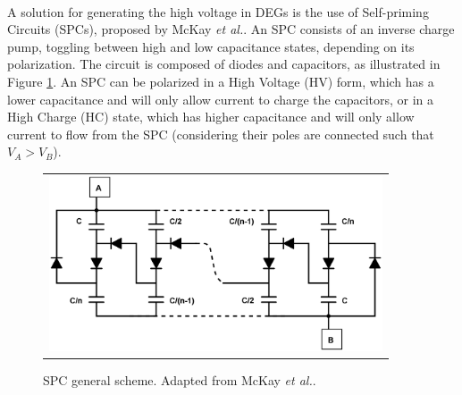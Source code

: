 \paragraph{} A solution for generating the high voltage in DEGs is the use of Self-priming Circuits (SPCs), proposed by McKay \textit{et al.}\cite{SPC2010}. An SPC consists of an inverse charge pump, toggling between high and low capacitance states, depending on its polarization. The circuit is composed of diodes and capacitors, as illustrated in Figure \ref{fig:spc}.  An SPC can be polarized in a High Voltage (HV) form, which has a lower capacitance and will only allow current to charge the capacitors, or in a High Charge (HC) state, which has higher capacitance and will only allow current to flow from the SPC (considering their poles are connected such that $V_A > V_B$).

\begin{figure}[ht]
\begin{center}
\begin{tabular}{c}
\includegraphics[height=5.2cm]{fig03/SPC_general.png}
\end{tabular}
\end{center}
\caption 
{ \label{fig:spc}
SPC general scheme. Adapted from McKay \textit{et al.}\cite{SPCdesign}. } 
\end{figure} 

